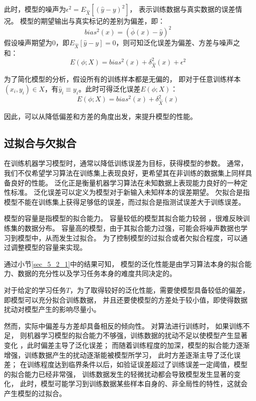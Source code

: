 此时，模型的噪声为$\epsilon^2 = E_{\hat{X}}\left[ (\hat{y} - y)^2\right]$，
表示训练数据与真实数据的误差情况。
模型的期望输出与真实标记的差别为偏差，即：
\begin{equation}
	bias^2(x) = (\overline{\phi}(x)  - \hat{y})^2
\end{equation}
假设噪声期望为$0$，即$E_{\hat{X}}[\hat{y} - y] = 0$，则可知泛化误差为偏差、方差与噪声之和：
\begin{equation}
	E(\phi; X) = bias^2(x) + \delta_{\hat{X}}^2(x) + \epsilon^2
\end{equation}

为了简化模型的分析，假设所有的训练样本都是无偏的，
即对于任意训练样本$(x_i, y_i) \in X$，有$\hat{y}_i \equiv y_i$。此时可得泛化误差$E(\phi; X) $：
\begin{equation}
	E(\phi; X) = bias^2(x) + \delta_{\hat{X}}^2(x) 
\end{equation}

因此，可以从降低偏差和方差的角度出发，来提升模型的性能。

\subsection{过拟合与欠拟合}

在训练机器学习模型时，通常以降低训练误差为目标，获得模型的参数。
通常，我们不仅希望学习算法在训练集上表现良好，更希望其在非训练的数据集上同样具备良好的性能。
泛化正是衡量机器学习算法在未知数据上表现能力良好的一种定性标准。
泛化误差可以定义为模型对于新输入未知样本的误差期望。
欠拟合是指模型不能在训练集上获得足够低的误差，而过拟合是指测试误差大于训练误差。\par

模型的容量是指模型的拟合能力。
容量较低的模型其拟合能力较弱 ，很难反映训练集的数据分布。
容量高的模型，由于其拟合能力过强，可能会将噪声数据也学习到模型中，从而发生过拟合。
为了控制模型的过拟合或者欠拟合程度，可以通过调整模型的容量来实现。\par

通过小节\ref{sec_5_2_1}中的结果可知，
模型的泛化性能是由学习算法本身的拟合能力、数据的充分性以及学习任务本身的难度共同决定的。

对于给定的学习任务$T$，为了取得较好的泛化性能，需要使模型具备较低的偏差，即模型可以充分拟合训练数据，
并且还要使模型的方差处于较小值，即使得数据扰动对模型产生的影响尽量小。\par

然而，实际中偏差与方差却具备相反的倾向性。
对算法进行训练时，
如果训练不足， 则机器学习模型的拟合能力不够强，训练数据的扰动不足以使模型产生显著变化
，此时偏差主导了泛化误差；
而随着训练程度的加深，模型的拟合能力逐渐增强，训练数据产生的扰动逐渐能被模型所学习，
此时方差逐渐主导了泛化误差；
在训练程度达到临界条件以后，如验证误差超过了训练误差一定阈值，模型的拟合能力已经非常强，
训练数据发生的轻微扰动都会导致模型发生显著的变化，
此时，模型可能学习到训练数据某些样本自身的、非全局性的特性，这就会产生模型的过拟合。\par

